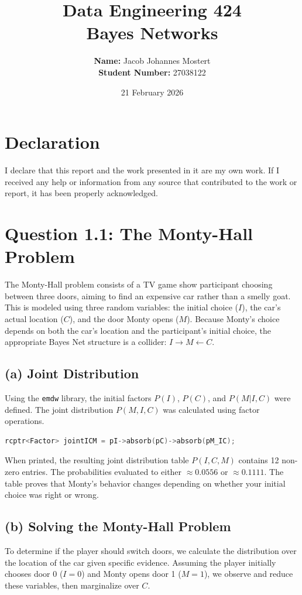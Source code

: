 \documentclass{article}
\title{
    \vspace{-2cm}
    \Large Data Engineering 424  \\
    \Large Bayes Networks  \\
}
\author{
    \textbf{Name:} Jacob Johannes Mostert \\ 
    \textbf{Student Number:} 27038122
}
\date{21 February 2026}
\begin{document}
\maketitle

\section*{Declaration}
I declare that this report and the work presented in it are my own work. If I received any help or information from any source that contributed to the work or report, it has been properly acknowledged.

\section{Question 1.1: The Monty-Hall Problem}
The Monty-Hall problem consists of a TV game show participant choosing between three doors, aiming to find an expensive car rather than a smelly goat. This is modeled using three random variables: the initial choice ($I$), the car's actual location ($C$), and the door Monty opens ($M$). Because Monty's choice depends on both the car's location and the participant's initial choice, the appropriate Bayes Net structure is a collider: $I \rightarrow M \leftarrow C$.

\subsection*{(a) Joint Distribution}
Using the \texttt{emdw} library, the initial factors $P(I)$, $P(C)$, and $P(M|I,C)$ were defined. The joint distribution $P(M,I,C)$ was calculated using factor operations. 

\begin{lstlisting}[language=C++, caption=Constructing the joint distribution]
rcptr<Factor> jointICM = pI->absorb(pC)->absorb(pM_IC);
\end{lstlisting}

When printed, the resulting joint distribution table $P(I,C,M)$ contains 12 non-zero entries. The probabilities evaluated to either $\approx 0.0556$ or $\approx 0.1111$. The table proves that Monty's behavior changes depending on whether your initial choice was right or wrong.

\subsection*{(b) Solving the Monty-Hall Problem}
To determine if the player should switch doors, we calculate the distribution over the location of the car given specific evidence. Assuming the player initially chooses door 0 ($I=0$) and Monty opens door 1 ($M=1$), we observe and reduce these variables, then marginalize over $C$.
\end{document}
